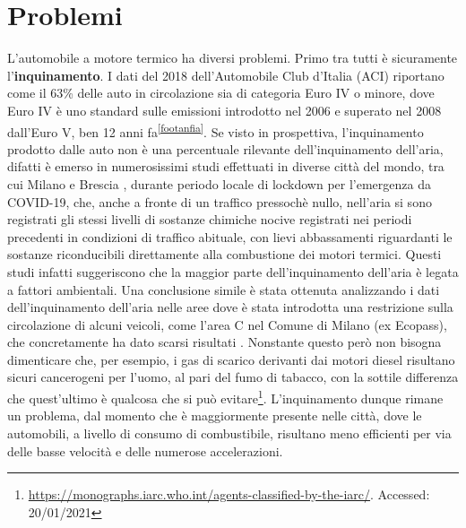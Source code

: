 \section{Problemi}


L'automobile a motore termico ha diversi problemi. Primo tra tutti è sicuramente l'\textbf{inquinamento}. I dati del 2018 dell'Automobile Club d'Italia (ACI) riportano come il 63\% delle auto in circolazione sia di categoria Euro IV o minore, dove Euro IV è uno standard sulle emissioni introdotto nel 2006 e superato nel 2008 dall'Euro V, ben 12 anni fa\textsuperscript{\ref{footanfia}}. Se visto in prospettiva, l'inquinamento prodotto dalle auto non è una percentuale rilevante dell'inquinamento dell'aria, difatti è emerso in numerosissimi studi effettuati in diverse città del mondo, tra cui Milano e Brescia \cite{collivignarelli2021analysis}\cite{cameletti2020effect}, durante periodo locale di lockdown per l'emergenza da COVID-19, che, anche a fronte di un traffico pressochè nullo, nell'aria si sono registrati gli stessi livelli di sostanze chimiche nocive registrati nei periodi precedenti in condizioni di traffico abituale, con lievi abbassamenti riguardanti le sostanze riconducibili direttamente alla combustione dei motori termici. Questi studi infatti suggeriscono che la maggior parte dell'inquinamento dell'aria è legata a fattori ambientali. Una conclusione simile è stata ottenuta analizzando i dati dell'inquinamento dell'aria nelle aree dove è stata introdotta una restrizione sulla circolazione di alcuni veicoli, come l'area C nel Comune di Milano (ex Ecopass), che concretamente ha dato scarsi risultati \cite{trentini2014lombardy}. Nonstante questo però non bisogna dimenticare che, per esempio, i gas di scarico derivanti dai motori diesel risultano sicuri cancerogeni per l'uomo, al pari del fumo di tabacco, con la sottile differenza che quest'ultimo è qualcosa che si può evitare\footnote{\url{https://monographs.iarc.who.int/agents-classified-by-the-iarc/}. Accessed: 20/01/2021}. L'inquinamento dunque rimane un problema, dal momento che è maggiormente presente nelle città, dove le automobili, a livello di consumo di combustibile, risultano meno efficienti per via delle basse velocità e delle numerose accelerazioni.

